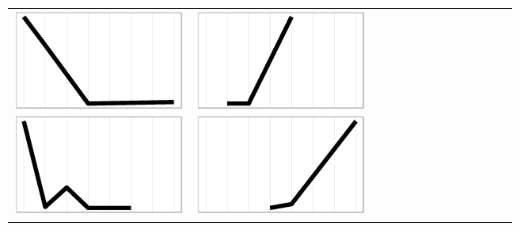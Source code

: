 \documentclass[10pt, conference, compsocconf]{IEEEtran}
\begin{document}
\begin{table}
\begin{tabular}{ | b{1.5cm} | c | c | c | c | c | c | c | c | c | c | c |}
 \includegraphics[scale=0.08]{figures/cbaa.ps} &  
 \includegraphics[scale=0.08]{figures/bbcb.ps} &  

\end{tabular}
\end{table}
\end{document}
